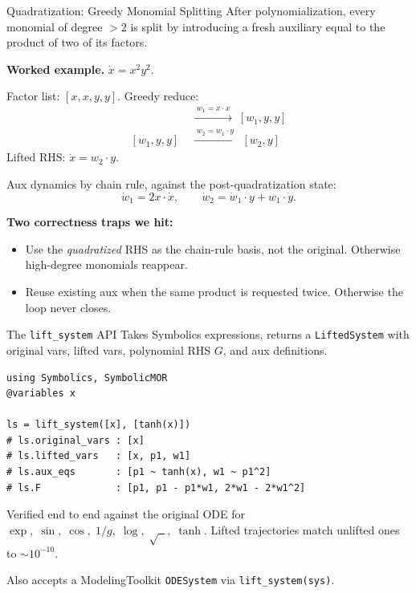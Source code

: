 \documentclass[aspectratio=169,10pt]{beamer}
\begin{document}
\begin{frame}{Quadratization: Greedy Monomial Splitting}
  After polynomialization, every monomial of degree $> 2$ is split by introducing a fresh auxiliary equal to the product of two of its factors.

  \medskip
  \textbf{Worked example.} $\dot{x} = x^2 y^2$.

  \medskip
  Factor list: $[x, x, y, y]$. Greedy reduce:
  \begin{align*}
    [x, x, y, y] \;&\xrightarrow{\;w_1 = x \cdot x\;}\; [w_1, y, y] \\
    [w_1, y, y]  \;&\xrightarrow{\;w_2 = w_1 \cdot y\;}\; [w_2, y]
  \end{align*}
  Lifted RHS: $\dot{x} = w_2 \cdot y$.

  \medskip
  Aux dynamics by chain rule, against the post-quadratization state:
  \[
    \dot{w}_1 = 2 x \cdot \dot{x}, \qquad
    \dot{w}_2 = \dot{w}_1 \cdot y + w_1 \cdot \dot{y}.
  \]

  \medskip
  \textbf{Two correctness traps we hit:}
  \begin{itemize}\setlength\itemsep{0pt}
    \item Use the \emph{quadratized} RHS as the chain-rule basis, not the original. Otherwise high-degree monomials reappear.
    \item Reuse existing aux when the same product is requested twice. Otherwise the loop never closes.
  \end{itemize}
\end{frame}

\begin{frame}[fragile]{The \texttt{lift\_system} API}
  Takes Symbolics expressions, returns a \texttt{LiftedSystem} with original vars, lifted vars, polynomial RHS $G$, and aux definitions.

\begin{lstlisting}
using Symbolics, SymbolicMOR
@variables x

ls = lift_system([x], [tanh(x)])
# ls.original_vars : [x]
# ls.lifted_vars   : [x, p1, w1]
# ls.aux_eqs       : [p1 ~ tanh(x), w1 ~ p1^2]
# ls.F             : [p1, p1 - p1*w1, 2*w1 - 2*w1^2]
\end{lstlisting}

  \medskip
  Verified end to end against the original ODE for
  $\exp,\;\sin,\;\cos,\;1/g,\;\log,\;\sqrt{\;\;},\;\tanh$. Lifted trajectories match unlifted ones to $\sim 10^{-10}$.

  \medskip
  Also accepts a ModelingToolkit \texttt{ODESystem} via \texttt{lift\_system(sys)}.
\end{frame}
\end{document}
